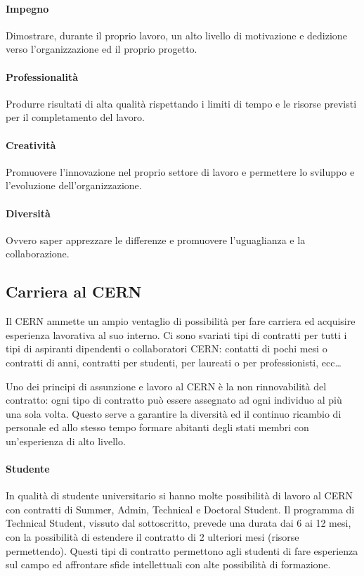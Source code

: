 			\paragraph{Impegno}Dimostrare, durante il proprio lavoro, un alto livello di motivazione e dedizione verso l'organizzazione ed il proprio progetto.
			
			\paragraph{Professionalit\`{a}}Produrre risultati di alta qualità rispettando i limiti di tempo e le risorse previsti per il completamento del lavoro.
			
			\paragraph{Creativit\`{a}}Promuovere l'innovazione nel proprio settore di lavoro e permettere lo sviluppo e l'evoluzione dell'organizzazione.
			
			\paragraph{Diversit\`{a}}Ovvero saper apprezzare le differenze e promuovere l'uguaglianza e la collaborazione.
		
		\subsection{Carriera al CERN} \label{subsec:C;l;carriera}
		
			Il \ac{CERN} ammette un ampio ventaglio di possibilità per fare carriera ed acquisire esperienza lavorativa al suo interno. Ci sono svariati tipi di contratti per tutti i tipi di aspiranti dipendenti o collaboratori \ac{CERN}: contatti di pochi mesi o contratti di anni, contratti per studenti, per laureati o per professionisti, ecc\dots \cite{cern:carreer}
			
			Uno dei principi di assunzione e lavoro al \ac{CERN} è la non rinnovabilità del contratto: ogni tipo di contratto può essere assegnato ad ogni individuo al più una sola volta. Questo serve a garantire la diversità ed il continuo ricambio di personale ed allo stesso tempo formare abitanti degli stati membri con un'esperienza di alto livello.
			
			\paragraph{Studente}In qualità di studente universitario si hanno molte possibilità di lavoro al \ac{CERN} con contratti di Summer, Admin, Technical e Doctoral Student. Il programma di Technical Student, vissuto dal sottoscritto, prevede una durata dai 6 ai 12 mesi, con la possibilità di estendere il contratto di 2 ulteriori mesi (risorse permettendo). Questi tipi di contratto permettono agli studenti di fare esperienza sul campo ed affrontare sfide intellettuali con alte possibilità di formazione.
			
